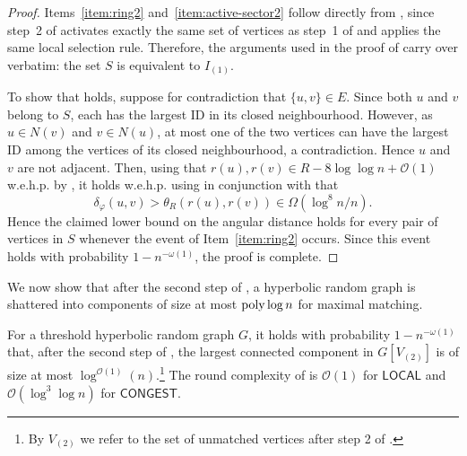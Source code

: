 \documentclass[letterpaper,11pt]{article}
\newcommand{\poly}{\operatorname{\text{{\rm poly}}}}
\newcommand{\wehp}{w.e.h.p.\xspace}
\newcommand{\1}{\mathbb I}
\newcommand{\bigO}{\mathcal{O}}
\newcommand{\CONGEST}{\ensuremath{\mathsf{CONGEST}}\xspace}
\newcommand{\LOCAL}{\ensuremath{\mathsf{LOCAL}}\xspace}
\newcommand{\angulardist}[2]{\delta_\varphi(#1,#2)}
\begin{document}
%
\begin{proof}
    Items~\ref{item:ring2} and~\ref{item:active-sector2} follow directly from
, since step~2 of \algos activates exactly the same set of
vertices as step~1 of \algos and applies the same local selection rule.
Therefore, the arguments used in the proof of  carry over
verbatim: the set $S$ is equivalent to $I_{(1)}$.

To show that  holds, suppose for contradiction that $\{u,v\}\in E$. Since both $u$ and $v$ belong
to $S$, each has the largest ID in its closed neighbourhood. However, as
$u\in N(v)$ and $v\in N(u)$, at most one of the two vertices can have the
largest ID among the vertices of its closed neighbourhood, a contradiction.
Hence $u$ and $v$ are not adjacent. Then, using that $r(u), r(v) \in R - 8 \log\log n +\bigO(1)$ \wehp by , it holds \wehp using  in conjunction with  that 
    $$
    \angulardist{u}{v} > \theta_R(r(u),r(v)) \in  \Omega(\log^8 n / n).
    $$
    Hence the claimed lower bound on the angular distance holds for every pair of vertices in $S$ whenever the event of
Item~\ref{item:ring2} occurs. Since this event holds with probability
$1-n^{-\omega(1)}$, the proof is complete.
\end{proof}
%
We now show that after the second step of \algos, a hyperbolic random graph is shattered into components of size at most $\poly\log n$ for maximal matching.
%
\begin{proposition}[MM Shattering]\label{pro:shattering-mm}
    For a threshold hyperbolic random graph $G$, it holds with probability $1 - n^{-\omega(1)}$ that, after the second step of \algos, the largest connected component in $G[V_{(2)}]$ is of size at most $\log^{\bigO(1)}(n)$.\footnote{By $V_{(2)}$ we refer to the set of unmatched vertices after step 2 of \algos.} The round complexity of \algos is $\bigO(1)$ for $\LOCAL$ and $\bigO(\log^3\log n)$ for $\CONGEST$.
\end{proposition}
%
\end{document}
